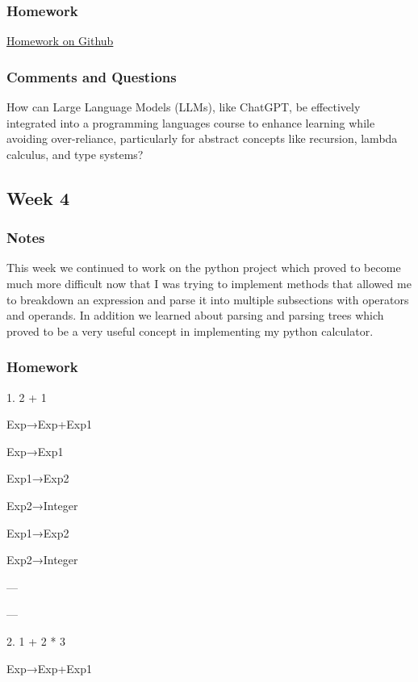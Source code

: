 \documentclass{article}
\theoremstyle{theorem}
\theoremstyle{definition}
\theoremstyle{remark}
\begin{document}
\subsubsection*{Homework}

\href{https://github.com/YoniKazovsky/reportrepo/tree/main/LLM-Literature-Review-PL}{Homework on Github}

\subsubsection*{Comments and Questions}

How can Large Language Models (LLMs), like ChatGPT, be effectively integrated into a programming languages course to enhance learning while avoiding over-reliance, particularly for abstract concepts like recursion, lambda calculus, and type systems?

\subsection{Week 4}



\subsubsection*{Notes}

This week we continued to work on the python project which proved to become much more difficult now that I was trying to implement methods that allowed me to breakdown an expression and parse it into multiple subsections with operators and operands.
In addition we learned about parsing and parsing trees which proved to be a very useful concept in implementing my python calculator.

\subsubsection*{Homework}

1. 2 + 1

Exp→Exp+Exp1

Exp→Exp1

Exp1→Exp2

Exp2→Integer

Exp1→Exp2

Exp2→Integer

---

---

2. 1 + 2 * 3

Exp→Exp+Exp1
\end{document}
